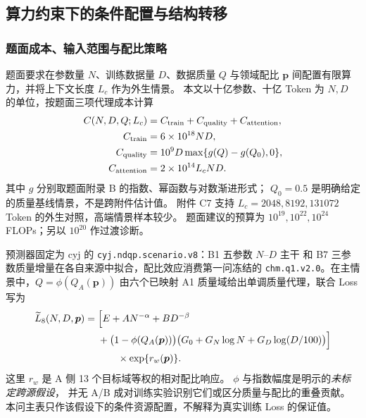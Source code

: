 \subsection{算力约束下的条件配置与结构转移}
\label{sec:q3_numerical}

\subsubsection{题面成本、输入范围与配比策略}
题面要求在参数量 $N$、训练数据量 $D$、数据质量 $Q$ 与领域配比
$\boldsymbol p$ 间配置有限算力，并将上下文长度 $L_c$ 作为外生情景。
本文以十亿参数、十亿 Token 为 $N,D$ 的单位，按题面三项代理成本计算
\begin{equation}
\begin{aligned}
C(N,D,Q;L_c)&=C_{\rm train}+C_{\rm quality}+C_{\rm attention},\\
C_{\rm train}&=6\times10^{18}ND,\\
C_{\rm quality}&=10^9D\max\{g(Q)-g(Q_0),0\},\\
C_{\rm attention}&=2\times10^{14}L_cND.
\end{aligned}
\label{eq:q3_cost_v8}
\end{equation}
其中 $g$ 分别取题面附录 B 的指数、幂函数与对数渐进形式；
$Q_0=0.5$ 是明确给定的质量基线情景，不是跨附件估计值。
附件 C7 支持 $L_c=2048,8192,131072$ Token 的外生对照，高端情景样本较少。
题面建议的预算为 $10^{19},10^{22},10^{24}$ FLOPs；另以 $10^{20}$ 作过渡诊断。

预测器固定为 cyj 的 \texttt{cyj.ndqp.scenario.v8}：B1 五参数 $N$--$D$ 主干
和 B7 三参数质量增量在各自来源中拟合，配比效应消费第一问冻结的
\texttt{chm.q1.v2.0}。在主情景中，$Q=\phi(Q_A(\boldsymbol p))$
由六个已映射 A1 质量域给出单调质量代理，联合 Loss 写为
\begin{equation}
\begin{aligned}
\widetilde L_8(N,D,\boldsymbol p)
={}&\Bigl[E+AN^{-\alpha}+BD^{-\beta}\\
&+\bigl(1-\phi(Q_A(\boldsymbol p))\bigr)
\bigl(G_0+G_N\log N+G_D\log(D/100)\bigr)\Bigr]\\
&\hspace{2em}\times\exp\{r_w(\boldsymbol p)\}.
\end{aligned}
\label{eq:q3_v8_loss}
\end{equation}
这里 $r_w$ 是 A 侧 13 个目标域等权的相对配比响应。
$\phi$ 与指数幅度是明示的\emph{未标定跨源假设}，
并无 A/B 成对训练实验识别它们或区分质量与配比的重叠贡献。
本问主表只作该假设下的条件资源配置，不解释为真实训练 Loss 的保证值。

